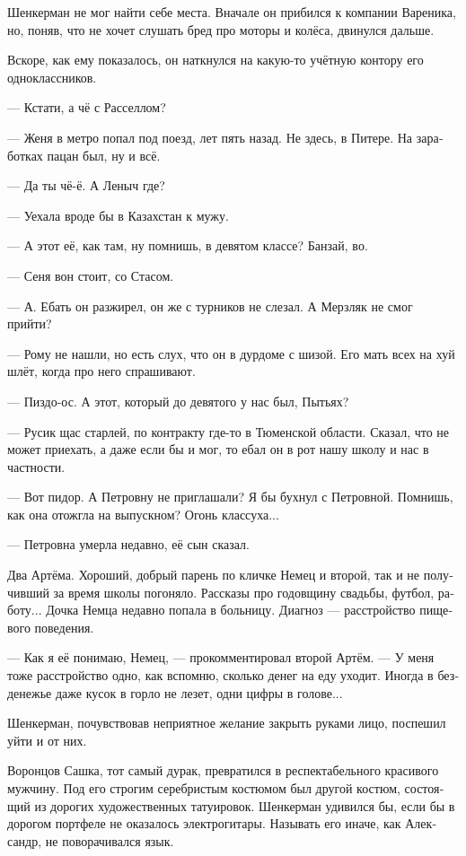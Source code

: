 \documentclass[a5paper,12pt,fleqn]{extbook}\usepackage{cooltooltips}\usepackage{polyglossia}\setdefaultlanguage[babelshorthands=true]{russian}\setotherlanguage{english}\defaultfontfeatures{Ligatures=TeX,Mapping=tex-text} \usepackage{xcolor}\definecolor{lightgray}{HTML}{bbbbbb}\color{lightgray}\newcommand{\ml}[3]{\textenglish{\textcolor{black}{#3}}}
\newcommand{\textspace}{\vspace{1em}{\centering\Large\bfseries<...>\par}\vspace{1em}}
\begin{document}
\textspace

Шенкерман не мог найти себе места.
Вначале он прибился к компании Вареника, но, поняв, что не хочет слушать бред про моторы и колёса, двинулся дальше.

Вскоре, как ему показалось, он наткнулся на какую-то учётную контору его одноклассников.

--- Кстати, а чё с Расселлом?

--- Женя в метро попал под поезд, лет пять назад.
Не здесь, в Питере.
На заработках пацан был, ну и всё.

--- Да ты чё-ё.
А Леныч где?

--- Уехала вроде бы в Казахстан к мужу.

--- А этот её, как там, ну помнишь, в девятом классе?
Банзай, во.

--- Сеня вон стоит, со Стасом.

--- А.
Ебать он разжирел, он же с турников не слезал.
А Мерзляк не смог прийти?

--- Рому не нашли, но есть слух, что он в дурдоме с шизой.
Его мать всех на хуй шлёт, когда про него спрашивают.

--- Пиздо-ос.
А этот, который до девятого у нас был, Пытьях?

--- Русик щас старлей, по контракту где-то в Тюменской области.
Сказал, что не может приехать, а даже если бы и мог, то ебал он в рот нашу школу и нас в частности.

--- Вот пидор.
А Петровну не приглашали?
Я бы бухнул с Петровной.
Помнишь, как она отожгла на выпускном?
Огонь классуха...

--- Петровна умерла недавно, её сын сказал.

Два Артёма.
Хороший, добрый парень по кличке Немец и второй, так и не получивший за время школы погоняло.
Рассказы про годовщину свадьбы, футбол, работу...
Дочка Немца недавно попала в больницу.
Диагноз --- расстройство пищевого поведения.

--- Как я её понимаю, Немец, --- прокомментировал второй Артём.
--- У меня тоже расстройство одно, как вспомню, сколько денег на еду уходит.
Иногда в безденежье даже кусок в горло не лезет, одни цифры в голове...

Шенкерман, почувствовав неприятное желание закрыть руками лицо, поспешил уйти и от них.

Воронцов Сашка, тот самый дурак, превратился в респектабельного красивого мужчину.
Под его строгим серебристым костюмом был другой костюм, состоящий из дорогих художественных татуировок.
Шенкерман удивился бы, если бы в дорогом портфеле не оказалось электрогитары.
Называть его иначе, как Александр, не поворачивался язык.
\end{document}
